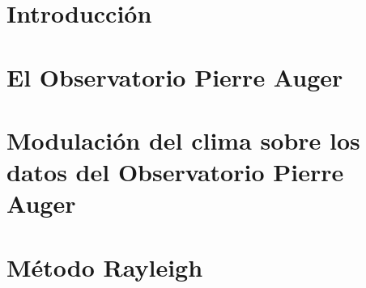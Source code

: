 \documentclass[12pt,papel,twoside,pagebackref]{ibtesis}
\begin{document}
\begin{preliminary}
	\tableofcontents                %
	\listoffigures                  %


\end{preliminary}

 \chapter{Introducción}
	\graphicspath{{../01_Introduccion/}}
	
  
 \chapter{El Observatorio Pierre Auger}
	\graphicspath{{../02_IntroduccionAuger/}}
	

	\graphicspath{{../03_IntroduccionReport/}}
	

\chapter{Modulación del clima sobre los datos del Observatorio Pierre Auger}

	\graphicspath{{../04_Clima/}}
	
	
	
	
	

	
\chapter{Método Rayleigh}
	\graphicspath{{../05_MetodoRayleigh/}}
	
\end{document}
